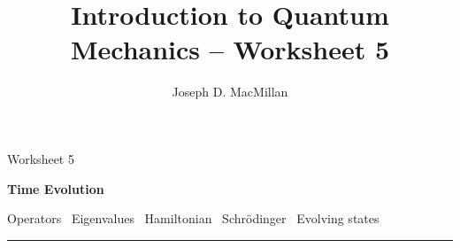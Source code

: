 \documentclass[10pt, letterpaper, twoside, openany]{article}
\title{Introduction to Quantum Mechanics -- Worksheet 5}
\author{Joseph D. MacMillan}
\date{}
\begin{document}
\pagestyle{fancy}

\Large \noindent Worksheet 5

\noindent \LARGE \textbf{Time Evolution}

\normalsize

\vspace{0.2in}

\noindent Operators  \bullet \  Eigenvalues   \bullet \ Hamiltonian \bullet \ Schr\"odinger \bullet \ Evolving states  

\vspace{0.1in}

\noindent \rule{\textwidth}{0.5pt}

\vspace{0.2in}
\end{document}
